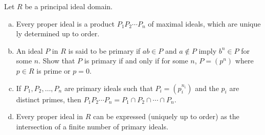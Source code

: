 $$ $$

\begin{ex}
    Let $R$ be a principal ideal domain.
    \begin{enumerate}[(a)]
        \item Every proper ideal is a product $P_{1}P_{2}\cdots P_{n}$ of maximal ideals, which are unique ly determined up to order.
        \item An ideal $P$ in $R$ is said to be primary if $ab\in P$ and $a\notin P$ imply $b^{n}\in P$ for some $n$. Show that $P$ is primary if and only if for some $n$, $P=(p^{n})$ where $p\in R$ is prime or $p=0$.
        \item If $P_{1}, P_{2},\dots, P_{n}$ are primary ideals such that $P_{i}=(p_{i}^{n_{i}})$ and the $p_{i}$ are distinct primes, then $P_{1}P_{2}\cdots P_{n}=P_{1}\cap P_{2}\cap \cdots\cap P_{n}$.
        \item Every proper ideal in $R$ can be expressed (uniquely up to order) as the intersection of a finite number of primary ideals.
    \end{enumerate}
\end{ex}

